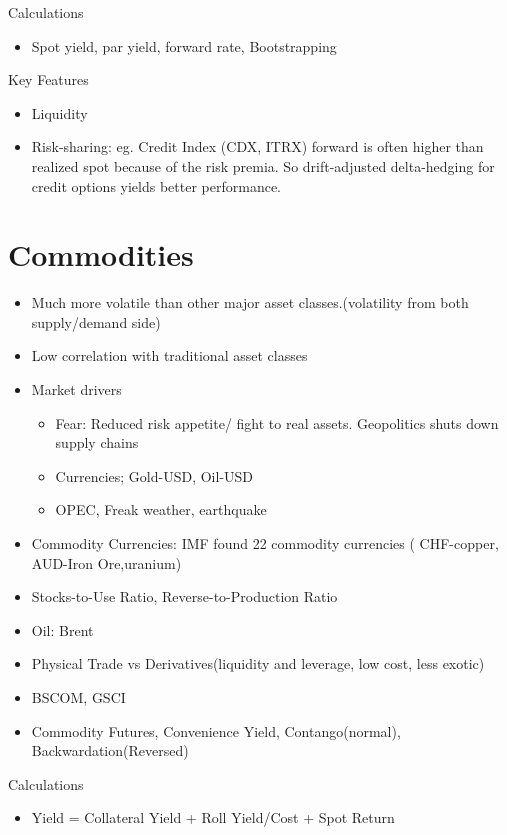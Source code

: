 \documentclass[11pt, openany]{book}              %
\begin{document}
Calculations
\begin{itemize}
    \item Spot yield, par yield, forward rate, Bootstrapping
\end{itemize}


Key Features

\begin{itemize}
	\item Liquidity
	\item Risk-sharing: eg. Credit Index (CDX, ITRX) forward is often higher than realized spot because of the risk premia. So drift-adjusted delta-hedging for credit options yields better performance.
\end{itemize}


\section{Commodities}

\begin{itemize}
    \item Much more volatile than other major asset classes.(volatility from both supply/demand side)
    \item Low correlation with traditional asset classes
    \item Market drivers
    \begin{itemize}
    	\item Fear: Reduced risk appetite/ fight to real assets. Geopolitics shuts down supply chains
    	\item Currencies; Gold-USD, Oil-USD
    	\item OPEC, Freak weather, earthquake
    \end{itemize}
    \item Commodity Currencies: IMF found 22 commodity currencies ( CHF-copper, AUD-Iron Ore,uranium)
    \item Stocks-to-Use Ratio, Reverse-to-Production Ratio
    \item Oil: Brent
    \item Physical Trade vs Derivatives(liquidity and leverage, low cost, less exotic)
    \item BSCOM, GSCI 
    \item Commodity Futures, Convenience Yield, Contango(normal), Backwardation(Reversed)
\end{itemize}

Calculations
\begin{itemize}
    \item Yield = Collateral Yield + Roll Yield/Cost + Spot Return
\end{itemize}
\end{document}

